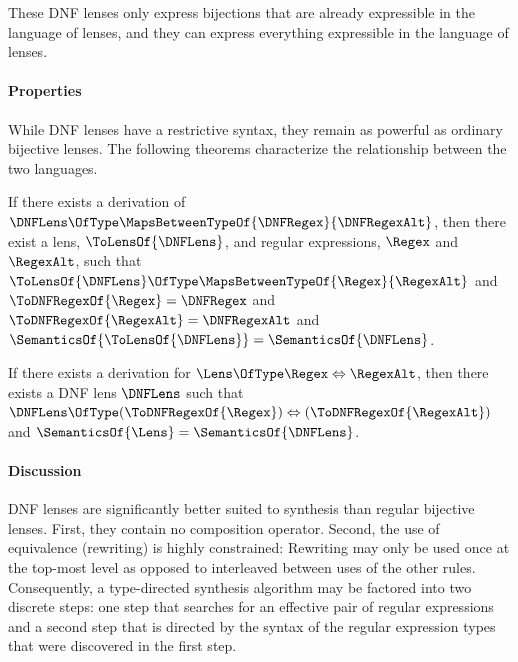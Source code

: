 \documentclass[acmsmall,screen]{acmart}
\begin{document}
\iffull
These DNF lenses only express bijections that are already expressible in the
language of lenses, and they can express everything expressible in the
language of lenses.
\fi

\paragraph*{Properties}  While DNF lenses have a restrictive syntax, they
remain as powerful as ordinary bijective lenses.  The following theorems
characterize the relationship between the two languages.

\begin{theorem}
  \label{thm:dnfls}
  If there exists a derivation of $\DNFLens \OfType \MapsBetweenTypeOf{\DNFRegex}{\DNFRegexAlt}$,
  then there exist a lens, $\ToLensOf{\DNFLens}$, and regular expressions, $\Regex$ and 
$\RegexAlt$, such that $\ToLensOf{\DNFLens} \OfType \MapsBetweenTypeOf{\Regex}{\RegexAlt}$ and
  $\ToDNFRegexOf{\Regex}=\DNFRegex$ and
  $\ToDNFRegexOf{\RegexAlt}=\DNFRegexAlt$ and
  $\SemanticsOf{\ToLensOf{\DNFLens}}=\SemanticsOf{\DNFLens}$.
\end{theorem}

\begin{theorem}
  \label{thm:dnflc}
  If there exists a derivation for $\Lens \OfType \Regex \Leftrightarrow
  \RegexAlt$,
  then there exists a DNF lens $\DNFLens$ such that
  $\DNFLens \OfType (\ToDNFRegexOf{\Regex}) \Leftrightarrow (\ToDNFRegexOf{\RegexAlt})$ and $\SemanticsOf{\Lens}=\SemanticsOf{\DNFLens}$.
\end{theorem}

\paragraph*{Discussion} 
DNF lenses are significantly better suited to synthesis than regular
bijective lenses.  First, they contain no composition operator.
Second, the use of equivalence (rewriting) is highly constrained:  Rewriting
may only be used once at the top-most level as opposed to interleaved
between uses of the other rules.  Consequently, a type-directed synthesis
algorithm may be factored into two discrete steps: one step that
searches for an effective pair of regular expressions
and a second step that is directed by the syntax of the regular expression
types that were discovered in the first step.
\end{document}
